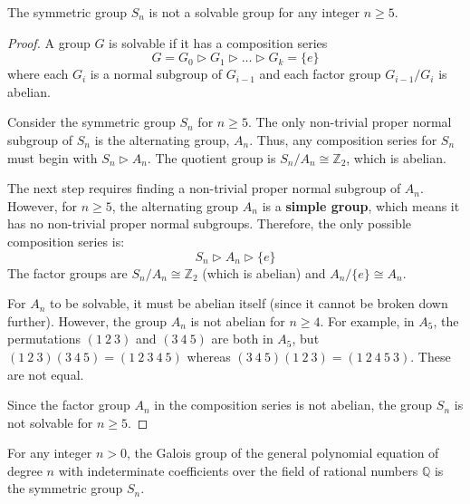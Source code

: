 \begin{lemma}
The symmetric group $S_n$ is not a solvable group for any integer $n \ge 5$.
\end{lemma}

\begin{proof}
A group $G$ is solvable if it has a composition series
$$G = G_0 \triangleright G_1 \triangleright \dots \triangleright G_k = \{e\}$$
where each $G_i$ is a normal subgroup of $G_{i-1}$ and each factor group $G_{i-1}/G_i$ is abelian.

Consider the symmetric group $S_n$ for $n \ge 5$. The only non-trivial proper normal subgroup of $S_n$ is the alternating group, $A_n$. Thus, any composition series for $S_n$ must begin with $S_n \triangleright A_n$. The quotient group is $S_n/A_n \cong \mathbb{Z}_2$, which is abelian.

The next step requires finding a non-trivial proper normal subgroup of $A_n$. However, for $n \ge 5$, the alternating group $A_n$ is a \textbf{simple group}, which means it has no non-trivial proper normal subgroups.
Therefore, the only possible composition series is:
$$S_n \triangleright A_n \triangleright \{e\}$$
The factor groups are $S_n/A_n \cong \mathbb{Z}_2$ (which is abelian) and $A_n/\{e\} \cong A_n$.

For $A_n$ to be solvable, it must be abelian itself (since it cannot be broken down further). However, the group $A_n$ is not abelian for $n \ge 4$. For example, in $A_5$, the permutations $(1 \ 2 \ 3)$ and $(3 \ 4 \ 5)$ are both in $A_5$, but $(1 \ 2 \ 3)(3 \ 4 \ 5) = (1 \ 2 \ 3 \ 4 \ 5)$ whereas $(3 \ 4 \ 5)(1 \ 2 \ 3) = (1 \ 2 \ 4 \ 5 \ 3)$. These are not equal.

Since the factor group $A_n$ in the composition series is not abelian, the group $S_n$ is not solvable for $n \ge 5$.
\end{proof}



\begin{lemma}
For any integer $n > 0$, the Galois group of the general polynomial equation of degree $n$ with indeterminate coefficients over the field of rational numbers $\mathbb{Q}$ is the symmetric group $S_n$.
\end{lemma}

